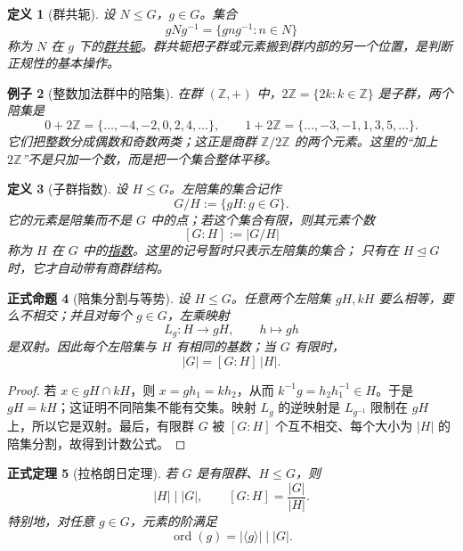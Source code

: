 \documentclass[UTF8,fontset=none,a4paper,11pt]{ctexart}
\theoremstyle{foundation-definition}
\newtheorem{definition}{定义}[section]
\theoremstyle{foundation-theorem}
\newtheorem{theorem}[definition]{正式定理}
\theoremstyle{foundation-proposition}
\newtheorem{proposition}[definition]{正式命题}
\theoremstyle{foundation-example}
\newtheorem{example}[definition]{例子}
\theoremstyle{foundation-remark}
\theoremstyle{foundation-theorem}
\newcommand{\term}[2]{\hyperref[#1]{#2}}
\begin{document}
\begin{definition}[群共轭]\label{def:conjugation}
设 \(N\leq G\)，\(g\in G\)。集合
\[
gNg^{-1}=\{gng^{-1}:n\in N\}
\]
称为 \(N\) 在 \(g\) 下的\term{def:conjugation}{群共轭}。群共轭把子群或元素搬到群内部的另一个位置，是判断正规性的基本操作。
\end{definition}

\begin{example}[整数加法群中的陪集]
在群 \((\mathbb Z,+)\) 中，\(2\mathbb Z=\{2k:k\in\mathbb Z\}\) 是子群，两个陪集是
\[
0+2\mathbb Z=\{\ldots,-4,-2,0,2,4,\ldots\},
\qquad
1+2\mathbb Z=\{\ldots,-3,-1,1,3,5,\ldots\}.
\]
它们把整数分成偶数和奇数两类；这正是商群 \(\mathbb Z/2\mathbb Z\) 的两个元素。这里的“加上 \(2\mathbb Z\)”不是只加一个数，而是把一个集合整体平移。
\end{example}

\begin{definition}[子群指数]\label{def:subgroup-index}
设 \(H\leq G\)。左陪集的集合记作
\[
G/H:=\{gH:g\in G\}.
\]
它的元素是陪集而不是 \(G\) 中的点；若这个集合有限，则其元素个数
\[
[G:H]:=|G/H|
\]
称为 \(H\) 在 \(G\) 中的\term{def:subgroup-index}{指数}。这里的记号暂时只表示左陪集的集合；
只有在 \(H\trianglelefteq G\) 时，它才自动带有商群结构。
\end{definition}

\begin{proposition}[陪集分割与等势]\label{prop:coset-partition}
设 \(H\leq G\)。任意两个左陪集 \(gH,kH\) 要么相等，要么不相交；并且对每个
\(g\in G\)，左乘映射
\[
L_g:H\longrightarrow gH,\qquad h\longmapsto gh
\]
是双射。因此每个左陪集与 \(H\) 有相同的基数；当 \(G\) 有限时，
\[
|G|=[G:H]\,|H|.
\]
\end{proposition}

\begin{proof}
若 \(x\in gH\cap kH\)，则 \(x=gh_1=kh_2\)，从而
\(k^{-1}g=h_2h_1^{-1}\in H\)。于是
\(gH=kH\)；这证明不同陪集不能有交集。映射 \(L_g\) 的逆映射是
\(L_{g^{-1}}\) 限制在 \(gH\) 上，所以它是双射。最后，有限群 \(G\) 被
\([G:H]\) 个互不相交、每个大小为 \(|H|\) 的陪集分割，故得到计数公式。
\end{proof}

\begin{theorem}[拉格朗日定理]\label{thm:lagrange}
若 \(G\) 是有限群、\(H\leq G\)，则
\[
|H|\mid |G|,
\qquad
[G:H]=\frac{|G|}{|H|}.
\]
特别地，对任意 \(g\in G\)，元素的阶满足
\[
\operatorname{ord}(g)=|\langle g\rangle|\mid |G|.
\]
\end{theorem}
\end{document}
